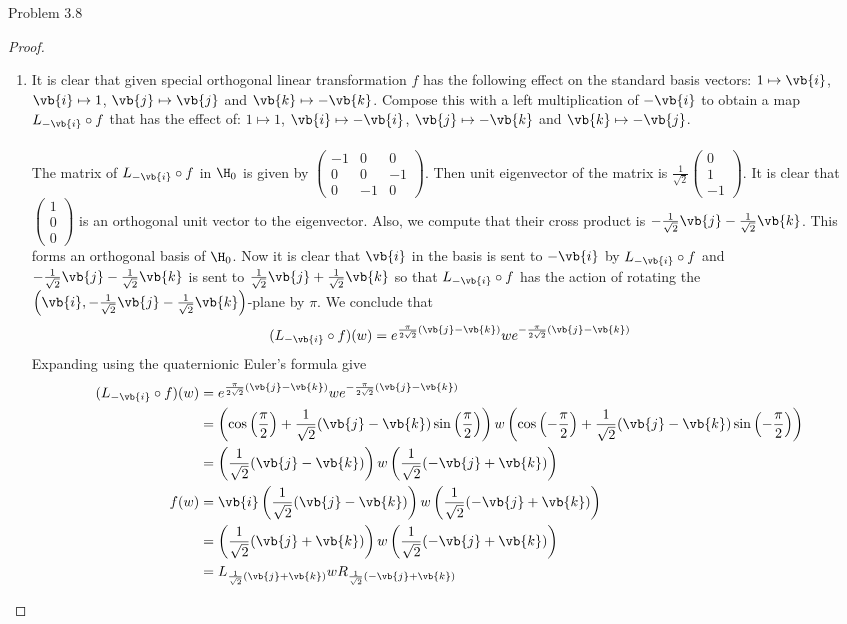 \documentclass[a4paper]{article}
\begin{document}
\begin{ex}{Problem 3.8}{}
\begin{proof}
\begin{enumerate}
\item It is clear that given special orthogonal linear transformation $f$ has the following effect on the standard basis vectors: $1\mapsto\vb{i}$, $\vb{i}\mapsto 1$, $\vb{j}\mapsto\vb{j}$ and $\vb{k}\mapsto-\vb{k}$. Compose this with a left multiplication of $-\vb{i}$ to obtain a map $L_{-\vb{i}}\circ f$ that has the effect of: $1\mapsto 1$, $\vb{i}\mapsto-\vb{i}$, $\vb{j}\mapsto-\vb{k}$ and $\vb{k}\mapsto-\vb{j}$. \\~\\

The matrix of $L_{-\vb{i}}\circ f$ in $\H_0$ is given by $\begin{pmatrix}
-1  & 0 & 0\\
0 & 0 & -1\\
0 & -1 & 0
\end{pmatrix}$. Then unit eigenvector of the matrix is $\frac{1}{\sqrt{2}}\begin{pmatrix}
0\\1\\-1
\end{pmatrix}$. It is clear that $\begin{pmatrix}
1\\0\\0
\end{pmatrix}$ is an orthogonal unit vector to the eigenvector. Also, we compute that their cross product is $-\frac{1}{\sqrt{2}}\vb{j}-\frac{1}{\sqrt{2}}\vb{k}$. This forms an orthogonal basis of $\H_0$. Now it is clear that $\vb{i}$ in the basis is sent to $-\vb{i}$ by $L_{-\vb{i}}\circ f$ and $-\frac{1}{\sqrt{2}}\vb{j}-\frac{1}{\sqrt{2}}\vb{k}$ is sent to $\frac{1}{\sqrt{2}}\vb{j}+\frac{1}{\sqrt{2}}\vb{k}$ so that $L_{-\vb{i}}\circ f$ has the action of rotating the $\left(\vb{i},-\frac{1}{\sqrt{2}}\vb{j}-\frac{1}{\sqrt{2}}\vb{k}\right)$-plane by $\pi$. We conclude that $$(L_{-\vb{i}}\circ f)(w)=e^{\frac{\pi}{2\sqrt{2}}(\vb{j}-\vb{k})}we^{-\frac{\pi}{2\sqrt{2}}(\vb{j}-\vb{k})}$$ Expanding using the quaternionic Euler's formula give 
\begin{align*}
(L_{-\vb{i}}\circ f)(w)&=e^{\frac{\pi}{2\sqrt{2}}(\vb{j}-\vb{k})}we^{-\frac{\pi}{2\sqrt{2}}(\vb{j}-\vb{k})}\\
&=\left(\cos\left(\frac{\pi}{2}\right)+\frac{1}{\sqrt{2}}(\vb{j}-\vb{k})\sin\left(\frac{\pi}{2}\right)\right)w\left(\cos\left(-\frac{\pi}{2}\right)+\frac{1}{\sqrt{2}}(\vb{j}-\vb{k})\sin\left(-\frac{\pi}{2}\right)\right)\\
&=\left(\frac{1}{\sqrt{2}}(\vb{j}-\vb{k})\right)w\left(\frac{1}{\sqrt{2}}(-\vb{j}+\vb{k})\right)\\
f(w)&=\vb{i}\left(\frac{1}{\sqrt{2}}(\vb{j}-\vb{k})\right)w\left(\frac{1}{\sqrt{2}}(-\vb{j}+\vb{k})\right)\\
&=\left(\frac{1}{\sqrt{2}}(\vb{j}+\vb{k})\right)w\left(\frac{1}{\sqrt{2}}(-\vb{j}+\vb{k})\right)\\
&=L_{\frac{1}{\sqrt{2}}(\vb{j}+\vb{k})}wR_{\frac{1}{\sqrt{2}}(-\vb{j}+\vb{k})}
\end{align*}
\end{enumerate}
\end{proof}
\end{ex}
\end{document}
